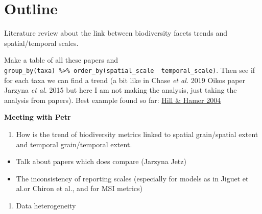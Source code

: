 \documentclass[
  12pt,
  oneside]{report}
\author{François Leroy, PhD student at CZU}
\date{2021-09-15}
\providecommand{\tightlist}{%
  \setlength{\itemsep}{0pt}\setlength{\parskip}{0pt}}
\begin{document}


\cleardoublepage 
{}

{
\hypersetup{linkcolor=}
\setcounter{tocdepth}{1}
\tableofcontents
\newpage
}
\vspace{50mm}


\cleardoublepage 
{}


\hypertarget{outline}{%
\chapter*{Outline}\label{outline}}

Literature review about the link between biodiversity facets trends and spatial/temporal scales.

Make a table of all these papers and \texttt{group\_by(taxa)\ \%\textgreater{}\%\ order\_by(spatial\_scale\ \textbar{}\ temporal\_scale)}. Then see if for each taxa we can find a trend (a bit like in Chase \emph{et al.} 2019 Oikos paper \textbar{} Jarzyna \emph{et al.} 2015 but here I am not making the analysis, just taking the analysis from papers). Best example found so far: \href{https://besjournals.onlinelibrary.wiley.com/doi/10.1111/j.0021-8901.2004.00926.x}{Hill \& Hamer 2004}

\textbf{Meeting with Petr}

\begin{enumerate}
\def\labelenumi{\arabic{enumi})}
\tightlist
\item
  How is the trend of biodiversity metrics linked to spatial grain/spatial extent and temporal grain/temporal extent.
\end{enumerate}

\begin{itemize}
\tightlist
\item
  Talk about papers which does compare (Jarzyna Jetz)
\item
  The inconsistency of reporting scales (especially for models as in Jiguet et al.or Chiron et al., and for MSI metrics)
\end{itemize}

\begin{enumerate}
\def\labelenumi{\arabic{enumi})}
\setcounter{enumi}{1}
\tightlist
\item
  Data heterogeneity
\end{enumerate}
\end{document}
